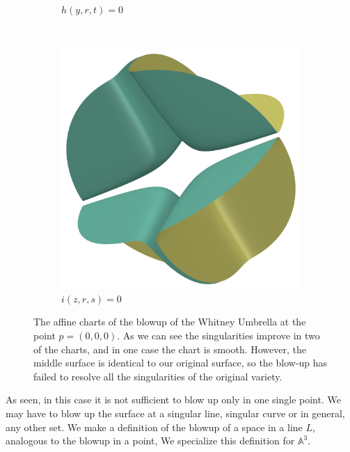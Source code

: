 \documentclass{article}
\newcommand{\A}{\ensuremath{\mathbb{A}}}
\begin{document}
\begin{example}
\begin{figure}[h]
\begin{subfigure}[t]{0.2\textwidth}
                \caption{$h(y, r, t) = 0$}
                \label{fig:whitney_blowup}
            \end{subfigure}      
            ~
            \begin{subfigure}[t]{0.2\textwidth}
                \includegraphics[width=\textwidth]{pictures/blowup_line_3.png}
                \caption{$i(z, r, s) = 0$}
            \end{subfigure}      
        \caption{The affine charts of the blowup of the Whitney Umbrella at the
            point $p = (0, 0, 0)$. As we can see the singularities improve in
            two of the charts, and in one case the chart is smooth. However,
            the middle surface is identical to our original surface, so the
            blow-up has failed to resolve all the singularities of the original
            variety.}
            \label{fig:blowup_line_charts}
        \end{figure}      
    \end{example} 
   
    As seen, in this case it is not sufficient to blow up only in one single
    point. We may have to blow up the surface at a singular line, singular
    curve or in general, any other set. We make a definition of the blowup of a
    space in a line $L$, analogous to the blowup in a point,  We specialize
    this definition for $\A^3$.
\end{document}
